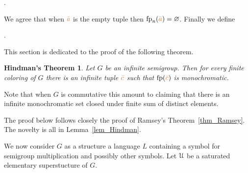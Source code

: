 \documentclass[creche.tex]{subfiles}
\begin{document}
.

We agree that when ${\color{brown}\bar a}$ is the empty tuple then ${\rm fp}_n({\color{brown}\bar a})=\varnothing$.
Finally we define

.

This section is dedicated to the proof of the following theorem.

\theoremstyle{mio}
\newtheorem{Hindman}[thm]{Hindman's Theorem}
\begin{Hindman}\label{thm_Hindman}
Let $G$ be an infinite semigroup.
Then for every finite coloring of $G$ there is an infinite tuple ${\color{brown}\bar c}$ such that ${\rm fp}({\color{brown}\bar c})$ is monochromatic.
\end{Hindman}

Note that when $G$ is commutative this amount to claiming that there is an infinite monochromatic set closed under finite sum of distinct elements.

The proof below follows closely the proof of Ramsey's Theorem~\ref{thm_Ramsey}.
The novelty is all in Lemma~\ref{lem_Hindman}.

We now consider $G$ as a structure a language $L$ containing a symbol for semigroup multiplication and possibly other symbols.
Let $\EuScript U$ be a saturated elementary superstucture of $G$.
\end{document}
